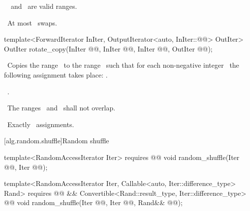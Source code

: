 \documentclass[american,twoside]{book}
\begin{document}
\begin{paras}
\begin{itemdescr}
\pnum
\requires\ 
\
and
\
are valid ranges.

\pnum
\complexity\ 
At most
\
swaps.
\end{itemdescr}

%
\color{addclr}\begin{itemdecl}
template<ForwardIterator InIter, OutputIterator<auto, InIter::@@> OutIter>
  OutIter rotate_copy(InIter @@, InIter @@,
                      InIter @@, OutIter @@);
\end{itemdecl}\color{black}

\begin{itemdescr}
\pnum
\effects\ 
Copies the range
\
to the range
\
such that for each non-negative integer
\
the following assignment takes place:
.

\pnum
\returns\ 
.

\pnum
\requires\ 
The ranges
\range{\farg{first}}{\farg{last}}\
and
\
shall not overlap.

\pnum
\complexity\ 
Exactly
\
assignments.
\end{itemdescr}

\rSec2[alg.random.shuffle]{Random shuffle}

%
\color{addclr}\begin{itemdecl}
template<RandomAccessIterator Iter>
  requires @@
  void random_shuffle(Iter @@,
                      Iter @@);

template<RandomAccessIterator Iter, Callable<auto, Iter::difference_type> Rand>
  requires @@
        && Convertible<Rand::result_type, Iter::difference_type>
        @@
  void random_shuffle(Iter @@,
                      Iter @@,
                      Rand&& @\farg{rand}@);


\end{itemdecl}
\end{paras}
\end{document}
